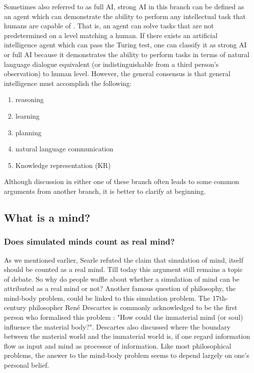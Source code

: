 \documentclass[11pt]{article}
\begin{document}
Sometimes also referred to as full AI, strong AI in this branch can be defined as an agent which can demonstrate the ability to perform any intellectual task that humans are capable of \cite{kurzweil2005singularity}. That is, an agent can solve tasks that are not predetermined on a level matching a human. If there exists an artificial intelligence agent which can pass the Turing test, one can classify it as strong AI or full AI because it demonstrates the ability to perform tasks in terms of natural language dialogue equivalent (or indistinguishable from a third person's observation) to human level. 
However, the general consensus is that general intelligence must accomplish the following:
\begin{enumerate}
\item reasoning
\item learning
\item planning
\item natural language communication
\item Knowledge representation (KR) 
\end{enumerate}

Although discussion in either one of these branch often leads to some common arguments from another branch, it is better to clarify at beginning.

\subsection{What is a mind?}
\label{sec:what_is_a_mind}

\subsubsection*{Does simulated minds count as real mind?}

As we mentioned earlier, Searle refuted the claim that simulation of mind, itself should be counted as a real mind. Till today this argument still remains a topic of debate. So why do people waffle about whether a simulation of mind can be attributed as a real mind or not? Another famous question of philosophy, the mind-body problem, could be linked to this simulation problem. The 17th-century philosopher Ren{\'e} Descartes is commonly acknowledged to be the first person who formalised this problem \cite{descartes1641meditationes}: "How could the immaterial mind (or soul) influence the material body?". Descartes also discussed where the boundary between the material world and the immaterial world is, if one regard information flow as input and mind as processor of information. Like most philosophical problems, the answer to the mind-body problem seems to depend largely on one's personal belief.
\end{document}
